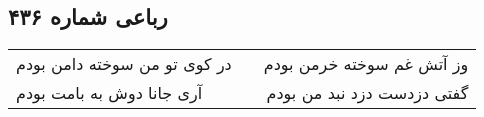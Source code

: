\begin{center}
\section*{رباعی شماره ۴۳۶}
\label{sec:sh436}
\begin{longtable}{l p{0.5cm} r}
در کوی تو من سوخته دامن بودم
&&
وز آتش غم سوخته خرمن بودم
\\
آری جانا دوش به بامت بودم
&&
گفتی دزدست دزد نبد من بودم
\\
\end{longtable}
\end{center}
